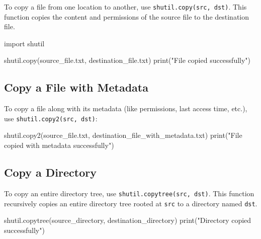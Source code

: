 \documentclass[
  letterpaper,
  DIV=11,
  numbers=noendperiod]{scrreprt}
\newenvironment{Shaded}{\begin{snugshade}}{\end{snugshade}}
\newcommand{\BuiltInTok}[1]{\textcolor[rgb]{0.00,0.23,0.31}{#1}}
\newcommand{\ImportTok}[1]{\textcolor[rgb]{0.00,0.46,0.62}{#1}}
\newcommand{\NormalTok}[1]{\textcolor[rgb]{0.00,0.23,0.31}{#1}}
\newcommand{\StringTok}[1]{\textcolor[rgb]{0.13,0.47,0.30}{#1}}
\begin{document}
To copy a file from one location to another, use
\texttt{shutil.copy(src,\ dst)}. This function copies the content and
permissions of the source file to the destination file.

\begin{Shaded}
\begin{Highlighting}[]
\ImportTok{import}\NormalTok{ shutil}

\NormalTok{shutil.copy(}\StringTok{\textquotesingle{}source\_file.txt\textquotesingle{}}\NormalTok{, }\StringTok{\textquotesingle{}destination\_file.txt\textquotesingle{}}\NormalTok{)}
\BuiltInTok{print}\NormalTok{(}\StringTok{"File copied successfully"}\NormalTok{)}
\end{Highlighting}
\end{Shaded}

\subsection{Copy a File with Metadata}\label{copy-a-file-with-metadata}

To copy a file along with its metadata (like permissions, last access
time, etc.), use \texttt{shutil.copy2(src,\ dst)}:

\begin{Shaded}
\begin{Highlighting}[]
\NormalTok{shutil.copy2(}\StringTok{\textquotesingle{}source\_file.txt\textquotesingle{}}\NormalTok{, }\StringTok{\textquotesingle{}destination\_file\_with\_metadata.txt\textquotesingle{}}\NormalTok{)}
\BuiltInTok{print}\NormalTok{(}\StringTok{"File copied with metadata successfully"}\NormalTok{)}
\end{Highlighting}
\end{Shaded}

\subsection{Copy a Directory}\label{copy-a-directory}

To copy an entire directory tree, use
\texttt{shutil.copytree(src,\ dst)}. This function recursively copies an
entire directory tree rooted at \texttt{src} to a directory named
\texttt{dst}.

\begin{Shaded}
\begin{Highlighting}[]
\NormalTok{shutil.copytree(}\StringTok{\textquotesingle{}source\_directory\textquotesingle{}}\NormalTok{, }\StringTok{\textquotesingle{}destination\_directory\textquotesingle{}}\NormalTok{)}
\BuiltInTok{print}\NormalTok{(}\StringTok{"Directory copied successfully"}\NormalTok{)}
\end{Highlighting}
\end{Shaded}
\end{document}

